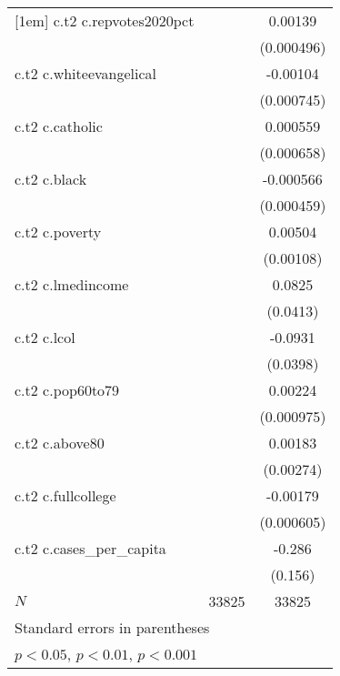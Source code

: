 {\begin{tabular}{l*{2}{c}}
[1em]
c.t2 c.repvotes2020pct&                     &     0.00139\sym{**} \\
            &                     &  (0.000496)         \\
[1em]
c.t2 c.whiteevangelical&                     &    -0.00104         \\
            &                     &  (0.000745)         \\
[1em]
c.t2 c.catholic&                     &    0.000559         \\
            &                     &  (0.000658)         \\
[1em]
c.t2 c.black&                     &   -0.000566         \\
            &                     &  (0.000459)         \\
[1em]
c.t2 c.poverty&                     &     0.00504\sym{***}\\
            &                     &   (0.00108)         \\
[1em]
c.t2 c.lmedincome&                     &      0.0825\sym{*}  \\
            &                     &    (0.0413)         \\
[1em]
c.t2 c.lcol &                     &     -0.0931\sym{*}  \\
            &                     &    (0.0398)         \\
[1em]
c.t2 c.pop60to79&                     &     0.00224\sym{*}  \\
            &                     &  (0.000975)         \\
[1em]
c.t2 c.above80&                     &     0.00183         \\
            &                     &   (0.00274)         \\
[1em]
c.t2 c.fullcollege&                     &    -0.00179\sym{**} \\
            &                     &  (0.000605)         \\
[1em]
c.t2 c.cases\_per\_capita&                     &      -0.286         \\
            &                     &     (0.156)         \\
\hline
\(N\)       &       33825         &       33825         \\
\hline\hline
\multicolumn{3}{l}{\footnotesize Standard errors in parentheses}\\
\multicolumn{3}{l}{\footnotesize \sym{*} \(p<0.05\), \sym{**} \(p<0.01\), \sym{***} \(p<0.001\)}\\
\end{tabular}
}
